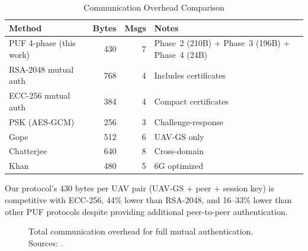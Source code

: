 \documentclass[11pt,a4paper]{article}
\begin{document}
\begin{table}[H]
\centering
\caption{Communication Overhead Comparison}
\label{tab:overhead_comparison}
\begin{tabular}{@{}lrrp{3cm}@{}}
\toprule
\textbf{Method} & \textbf{Bytes} & \textbf{Msgs} & \textbf{Notes} \\
\midrule
PUF 4-phase (this work) & 430 & 7 & Phase~2 (210B) + Phase~3 (196B) + Phase~4 (24B) \\
RSA-2048 mutual auth & 768 & 4 & Includes certificates \\
ECC-256 mutual auth & 384 & 4 & Compact certificates \\
PSK (AES-GCM) & 256 & 3 & Challenge-response \\
Gope~\cite{puf_lightweight_uav} & 512 & 6 & UAV-GS only \\
Chatterjee~\cite{puf_uav_cross_domain} & 640 & 8 & Cross-domain \\
Khan~\cite{puf_6g_uav} & 480 & 5 & 6G optimized \\
\bottomrule
\end{tabular}
\end{table}

Our protocol's 430 bytes per UAV pair (UAV-GS + peer + session key) is competitive with ECC-256, 44\% lower than RSA-2048, and 16--33\% lower than other PUF protocols despite providing additional peer-to-peer authentication.

\begin{figure}[H]
\centering
{}
\caption{Total communication overhead for full mutual authentication. Sources: \cite{puf_lightweight_uav, puf_uav_cross_domain, puf_6g_uav}.}
\label{fig:overhead_bar}
\end{figure}
\end{document}
